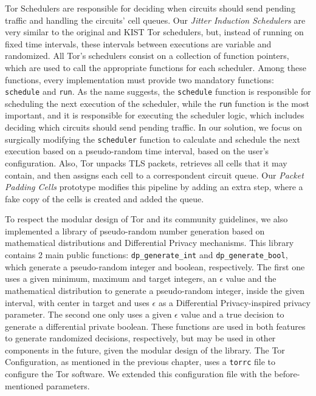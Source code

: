 Tor Schedulers are responsible for deciding when circuits should send pending traffic and handling the circuits' cell queues.  Our \textit{Jitter Induction Schedulers} are very similar to the original and KIST Tor schedulers, but, instead of running on fixed time intervals, these intervals between executions are variable and randomized. All Tor's schedulers consist on a collection of function pointers, which are used to call the appropriate functions for each scheduler. Among these functions, every implementation must provide two mandatory functions: \texttt{schedule} and \texttt{run}. As the name suggests, the \texttt{schedule} function is responsible for scheduling the next execution of the scheduler, while the \texttt{run} function is the most important, and it is responsible for executing the scheduler logic, which includes deciding which circuits should send pending traffic.
In our solution, we focus on surgically modifying the \texttt{scheduler} function to calculate and schedule the next execution based on a pseudo-random time interval, based on the user's configuration.  
Also, Tor unpacks TLS packets, retrieves all cells that it may contain, and then assigns each cell to a correspondent circuit queue. Our \textit{Packet Padding Cells} prototype modifies this pipeline by adding an extra step, where a fake copy of the cells is created and added the queue.

To respect the modular design of Tor and its community guidelines, we also implemented a library of pseudo-random number generation based on mathematical distributions and Differential Privacy mechanisms. This library contains 2 main public functions: \texttt{dp\_generate\_int} and \texttt{dp\_generate\_bool}, which generate a pseudo-random integer and boolean, respectively. The first one uses a given minimum, maximum and target integers, an $\epsilon$ value and the mathematical distribution to generate a pseudo-random integer, inside the given interval, with center in target and uses $\epsilon$ as a Differential Privacy-inspired privacy parameter. The second one only uses a given $\epsilon$ value and a true decision to generate a differential private boolean. These functions are used in both features to generate randomized decisions, respectively, but may be used in other components in the future, given the modular design of the library.
The Tor Configuration, as mentioned in the previous chapter, uses a \texttt{torrc} file to configure the Tor software. We extended this configuration file with the before-mentioned parameters.

